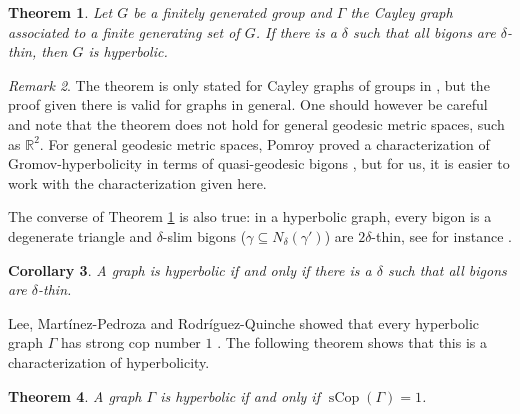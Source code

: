 \documentclass{amsart}
\newtheorem{theorem}{Theorem}[section]
\newtheorem{corollary}[theorem]{Corollary}
\theoremstyle{definition}
\theoremstyle{remark}
\newtheorem{remark}[theorem]{Remark}
\theoremstyle{remark}
\theoremstyle{definition}
\newcommand{\sCop}{\operatorname{sCop}}
\begin{document}

\begin{theorem}\cite[Theorem 1.4]{Pap95}\label{thm:papasoglu}
    Let $G$ be a finitely generated group and $\Gamma$ the Cayley graph associated to a finite generating set of $G$. If there is a $\delta$ such that all bigons are $\delta$-thin, then $G$ is hyperbolic.
\end{theorem}

\begin{remark}
The theorem is only stated for Cayley graphs of groups in \cite{Pap95}, but the proof given there is valid for graphs in general. One should however be careful and note that the theorem does not hold for general geodesic metric spaces, such as $\mathbb{R}^2$. For general geodesic metric spaces, Pomroy proved a characterization of Gromov-hyperbolicity in terms of quasi-geodesic bigons \cite[Theorem 22]{ChNi07}, but for us, it is easier to work with the characterization given here.
\end{remark}
The converse of Theorem \ref{thm:papasoglu} is also true: in a hyperbolic graph, every bigon is a degenerate triangle and $\delta$-slim bigons ($\gamma \subseteq N_\delta(\gamma')$) are $2\delta$-thin, see for instance \cite[Lemma 4]{ChNi07}.
\begin{corollary}\label{cor:papasoglu}
    A graph is hyperbolic if and only if there is a $\delta$ such that all bigons are $\delta$-thin.
\end{corollary}
Lee, Martínez-Pedroza and Rodríguez-Quinche showed that every hyperbolic graph $\Gamma$ has strong cop number $1$ \cite[Theorem A]{LMR23}. The following theorem shows that this is a characterization of hyperbolicity.
\begin{theorem}\label{thm:scop-hyperbolic}
    A graph $\Gamma$ is hyperbolic if and only if $\sCop(\Gamma) = 1$.
\end{theorem}
\end{document}
